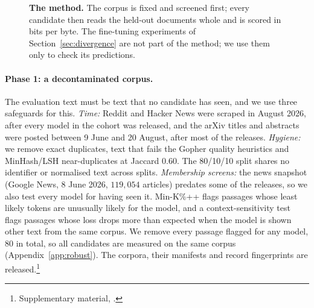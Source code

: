 \documentclass[10pt]{article}
\newcommand{\repourl}{https://github.com/DavidAfonsoValente/entropy-bench}
\newcommand{\repolink}[1]{\expandafter\url\expandafter{\detokenize\expandafter{\repourl#1}}}
\newcommand{\artifact}[1]{\footnote{Supplementary material, \texttt{\detokenize{#1}}.}}
\newcommand{\artifact}[1]{\footnote{\repolink{/tree/main/#1}}}
\begin{document}
\begin{figure}[t]
\centering
{}
\caption{\textbf{The method.} The corpus is fixed and screened first; every candidate then reads
the held-out documents whole and is scored in bits per byte. The fine-tuning experiments of
Section~\ref{sec:divergence} are not part of the method; we use them only to check its
predictions.}
\label{fig:protocol}
\end{figure}

\paragraph{Phase 1: a decontaminated corpus.} The evaluation text must be text that no candidate
has seen, and we use three safeguards for this. \emph{Time:} Reddit and Hacker News were scraped in
August 2026, after every model in the cohort was released, and the arXiv titles and abstracts were
posted between 9 June and 20 August, after most of the releases. \emph{Hygiene:} we remove exact
duplicates, text that fails the Gopher quality heuristics \citep{rae2021gopher} and MinHash/LSH
near-duplicates \citep{broder1997resemblance} at Jaccard $0.60$. The 80/10/10 split shares no
identifier or normalised text across splits. \emph{Membership screens:} the news snapshot (Google
News, 8 June 2026, $119{,}054$ articles) predates some of the releases, so we also test every model
for having seen it. Min-K\%++ \citep{zhang2025minkpp} flags passages whose least likely tokens are
unusually likely for the model, and a context-sensitivity test flags passages whose loss drops more
than expected when the model is shown other text from the same corpus. We remove every passage
flagged for any model, $80$ in total, so all candidates are measured on the same corpus
(Appendix~\ref{app:robust}). The corpora, their manifests and record fingerprints are
released.\artifact{docs/DATASET.md}
\end{document}
